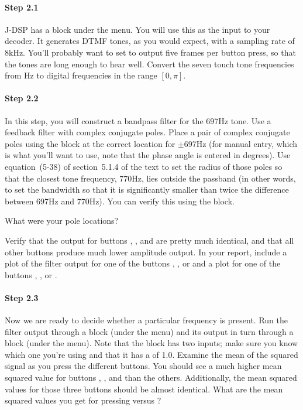 \paragraph{Step 2.1} J-DSP has a  block under the
 menu. You will use this as the input to your
decoder. It generates DTMF tones, as you would expect, with a sampling
rate of 8kHz. You'll probably want to set  to output
five frames per button press, so that the tones are long enough to
hear well.  Convert the seven touch tone frequencies from Hz to
digital frequencies in the range $[0, \pi]$.


\paragraph{Step 2.2} In this step, you will construct a bandpass
filter for the 697Hz tone. Use a feedback filter with complex
conjugate poles. Place a pair of complex conjugate poles using the
 block at the correct location for $\pm$697Hz (for
manual entry, which is what you'll want to use, note that the phase
angle is entered in degrees). Use equation~(5-38) of section~5.1.4 of
the text to set the radius of those poles so that the closest tone
frequency, 770Hz, lies outside the passband (in other words, to set
the bandwidth so that it is significantly smaller than twice the
difference between 697Hz and 770Hz). You can verify this using the
 block.

What were your pole locations?


Verify that the output for buttons , , and
 are pretty much identical, and that all other buttons
produce much lower amplitude output.  In your report, include a plot
of the filter output for one of the buttons , , or
 and a plot for one of the buttons , ,
or .


\paragraph{Step 2.3} Now we are ready to decide whether a particular
frequency is present. Run the filter output through a 
block (under the  menu) and its output in turn
through a  block (under the 
menu). Note that the  block has two inputs; make sure
you know which one you're using and that it has a 
of 1.0. Examine the mean of the squared signal as you press the
different  buttons. You should see a much higher
mean squared value for buttons , , and 
than the others. Additionally, the mean squared values for those three
buttons should be almost identical. What are the mean squared values
you get for pressing  versus ?

